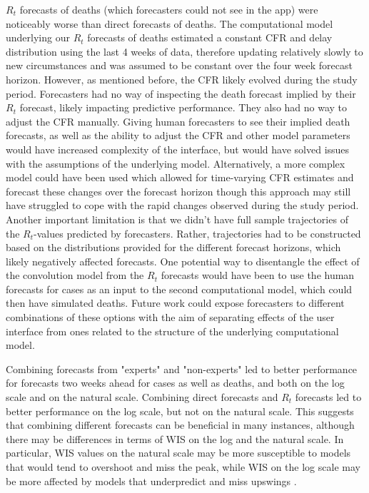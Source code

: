 \documentclass[10pt,a4paper,twocolumn]{article}
\begin{document}
$R_t$ forecasts of deaths (which forecasters could not see in the app) were noticeably worse than direct forecasts of deaths. The computational model underlying our $R_t$ forecasts of deaths estimated a constant CFR and delay distribution using the last 4 weeks of data, therefore updating relatively slowly to new circumstances and was assumed to be constant over the four week forecast horizon. However, as mentioned before, the CFR likely evolved during the study period. Forecasters had no way of inspecting the death forecast implied by their $R_t$ forecast, likely impacting predictive performance. They also had no way to adjust the CFR manually. Giving human forecasters to see their implied death forecasts, as well as the ability to adjust the CFR and other model parameters would have increased complexity of the interface, but would have solved issues with the assumptions of the underlying model. Alternatively, a more complex model could have been used which allowed for time-varying CFR estimates and forecast these changes over the forecast horizon though this approach may still have struggled to cope with the rapid changes observed during the study period. Another important limitation is that we didn't have full sample trajectories of the $R_t$-values predicted by forecasters. Rather, trajectories had to be constructed based on the distributions provided for the different forecast horizons, which likely negatively affected forecasts. One potential way to disentangle the effect of the convolution model from the $R_t$ forecasts would have been to use the human forecasts for cases as an input to the second computational model, which could then have simulated deaths. Future work could expose forecasters to different combinations of these options with the aim of separating effects of the user interface from ones related to the structure of the underlying computational model.


Combining forecasts from "experts" and "non-experts" led to better performance for forecasts two weeks ahead for cases as well as deaths, and both on the log scale and on the natural scale. Combining direct forecasts and $R_t$ forecasts led to better performance on the log scale, but not on the natural scale. This suggests that combining different forecasts can be beneficial in many instances, although there may be differences in terms of WIS on the log and the natural scale. In particular, WIS values on the natural scale may be more susceptible to models that would tend to overshoot and miss the peak, while WIS on the log scale may be more affected by models that underpredict and miss upswings \citep{bosseTransformationForecastsEvaluating2023}. 
\end{document}

